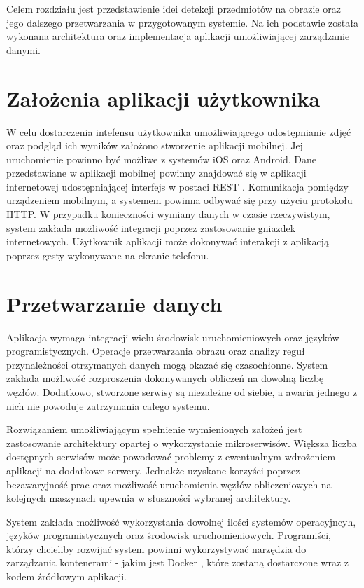 Celem rozdziału jest przedstawienie idei detekcji przedmiotów na obrazie oraz jego dalszego przetwarzania w przygotowanym systemie. Na ich podstawie została wykonana architektura oraz implementacja aplikacji umożliwiającej zarządzanie danymi. 


\section{Założenia aplikacji użytkownika}{
W celu dostarczenia intefensu użytkownika umożliwiającego udostępnianie zdjęć oraz podgląd ich wyników założono stworzenie aplikacji mobilnej. Jej uruchomienie powinno być możliwe z systemów iOS oraz Android. Dane przedstawiane w aplikacji mobilnej powinny znajdować się w aplikacji internetowej udostępniającej interfejs w postaci REST \cite{REST}. Komunikacja pomiędzy urządzeniem mobilnym, a systemem powinna odbywać się przy użyciu protokołu HTTP. W przypadku konieczności wymiany danych w czasie rzeczywistym, system zakłada możliwość integracji poprzez zastosowanie gniazdek internetowych. Użytkownik aplikacji może dokonywać interakcji z aplikacją poprzez gesty wykonywane na ekranie telefonu. 
}

\section{Przetwarzanie danych}{
Aplikacja wymaga integracji wielu środowisk uruchomieniowych oraz języków programistycznych. Operacje przetwarzania obrazu oraz analizy reguł przynależności otrzymanych danych mogą okazać się czasochłonne. System zakłada możliwość rozproszenia dokonywanych obliczeń na dowolną liczbę węzłów. Dodatkowo, stworzone serwisy są niezależne od siebie, a awaria jednego z nich nie powoduje zatrzymania całego systemu. 

Rozwiązaniem umożliwiającym spełnienie wymienionych założeń jest zastosowanie architektury opartej o wykorzystanie mikroserwisów. Większa liczba dostępnych serwisów może powodować problemy z ewentualnym wdrożeniem aplikacji na dodatkowe serwery. Jednakże uzyskane korzyści poprzez bezawaryjność prac oraz możliwość uruchomienia węzłów obliczeniowych na kolejnych maszynach upewnia w słuszności wybranej architektury. 

System zakłada możliwość wykorzystania dowolnej ilości systemów operacyjncyh, języków programistycznych oraz środowisk uruchomieniowych. Programiści, którzy chcieliby rozwijać system powinni wykorzystywać narzędzia do zarządzania kontenerami - jakim jest Docker \cite{Docker}, które zostaną dostarczone wraz z kodem źródłowym aplikacji.
}

